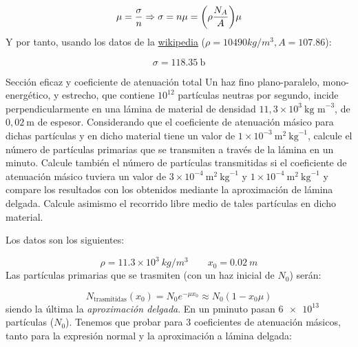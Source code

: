\begin{equation}
    \mu = \frac{\sigma}{n} \Rightarrow \sigma = n \mu = \pqty{\rho \frac{N_A}{A}} \mu
\end{equation}
Y por tanto, usando los datos de la \href{https://es.wikipedia.org/wiki/Plata}{wikipedia} ($\rho=10490 \unit{kg/m^3}, A=107.86$):

\begin{equation}
    \sigma = \SI{118.35}{\barn}
\end{equation}


\begin{Ejercicio}{Sección eficaz y coeficiente de atenuación total} 
    Un haz fino plano-paralelo, mono-energético, y estrecho, que contiene $10^{12}$ partículas neutras por segundo, incide perpendicularmente en una lámina de material de densidad $11,3 \times 10^{3}\ \text{kg m}^{-3}$, de $0,02\ \text{m}$ de espesor. Considerando que el coeficiente de atenuación másico para dichas partículas y en dicho material tiene un valor de $1 \times 10^{-3}\ \text{m}^2 \ \text{kg}^{-1}$, calcule el número de partículas primarias que se transmiten a través de la lámina en un minuto. Calcule también el número de partículas transmitidas si el coeficiente de atenuación másico tuviera un valor de $3 \times 10^{-4}\ \text{m}^2 \ \text{kg}^{-1}$ y $1 \times 10^{-4}\ \text{m}^2 \ \text{kg}^{-1}$ y compare los resultados con los obtenidos mediante la aproximación de lámina delgada. Calcule asimismo el recorrido libre medio de tales partículas en dicho material.
\end{Ejercicio}

Los datos son los siguientes:

\[ \rho=11.3\times 10^3  \ \unit{kg/m^3} \qquad x_0 = 0.02 \ \unit{m} \]
Las partículas primarias que se trasmiten (con un haz inicial de $N_0$) serán:

\begin{equation}
    N_{\text{trasmitidas}}(x_0)=N_0 e^{-\mu x_0} \approx N_0 (1-x_0\mu)
\end{equation}
siendo la última la \textit{aproximación delgada}. En un pminuto pasan $\SI{6e13}{}$ partículas ($N_0$). Tenemos que probar para 3 coeficientes de atenuación másicos, tanto para la expresión normal y la aproximación a lámina delgada: 

